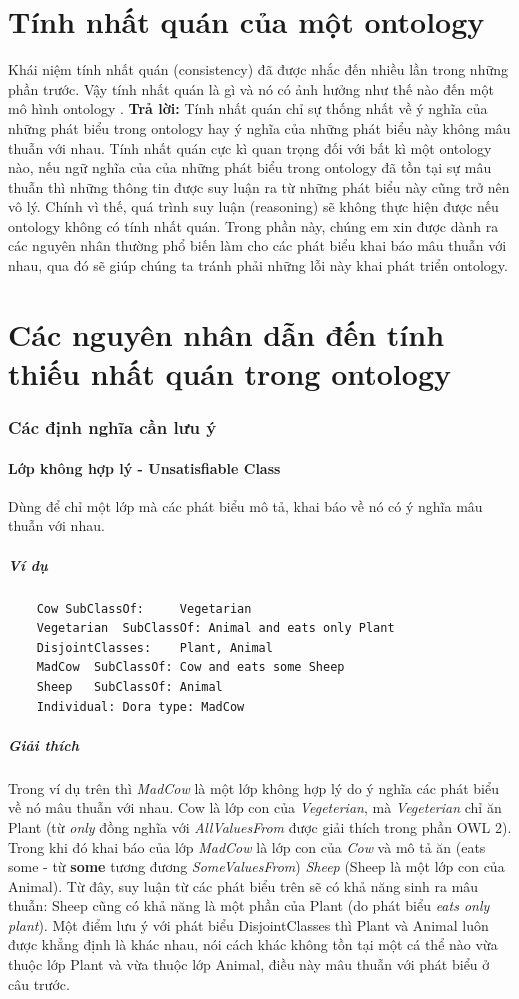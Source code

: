 \section{Tính nhất quán của một ontology}
Khái niệm tính nhất quán (consistency) đã được nhắc đến nhiều lần trong những phần trước. Vậy tính nhất quán là gì và nó có ảnh hưởng như thế nào đến một mô hình ontology . \textbf{Trả lời:} Tính nhất quán chỉ sự thống nhất về ý nghĩa của những phát biểu trong ontology hay ý nghĩa của những phát biểu này không mâu thuẫn với nhau. Tính nhất quán cực kì quan trọng đối với bất kì một ontology nào, nếu ngữ nghĩa của của những phát biểu trong ontology đã tồn tại sự mâu thuẫn thì những thông tin được suy luận ra từ những phát biểu này cũng trở nên vô lý. Chính vì thế, quá trình suy luận (reasoning) sẽ không thực hiện được nếu ontology không có tính nhất quán. Trong phần này, chúng em xin được dành ra các nguyên nhân thường phổ biến làm cho các phát biểu khai báo mâu thuẫn với nhau, qua đó sẽ giúp chúng ta tránh phải những lỗi này khai phát triển ontology.
\section{Các nguyên nhân dẫn đến tính thiếu nhất quán trong ontology}
\subsubsection{Các định nghĩa cần lưu ý \cite{satisfy}}
\paragraph{Lớp không hợp lý - Unsatisfiable Class} Dùng để chỉ một lớp mà các phát biểu mô tả, khai báo về nó có ý nghĩa mâu thuẫn với nhau.
\subparagraph{Ví dụ}
	\begin{verbatim}
	Cow	SubClassOf: 	Vegetarian
	Vegetarian	SubClassOf: Animal and eats only Plant
	DisjointClasses:	Plant, Animal
	MadCow 	SubClassOf: Cow and eats some Sheep
	Sheep 	SubClassOf: Animal
	Individual: Dora type: MadCow
	\end{verbatim}
\subparagraph{Giải thích} Trong ví dụ trên thì \textit{MadCow} là một lớp không hợp lý do ý nghĩa các phát biểu về nó mâu thuẫn với nhau. Cow là lớp con của \textit{Vegeterian}, mà \textit{Vegeterian} chỉ ăn Plant (từ \textit{only} đồng nghĩa với \textit{AllValuesFrom} được giải thích trong phần OWL 2). Trong khi đó khai báo của lớp \textit{MadCow} là lớp con của \textit{Cow} và mô tả ăn (eats some - từ \textbf{some} tương đương \textit{SomeValuesFrom}) \textit{Sheep} (Sheep là một lớp con của Animal). Từ đây, suy luận từ các phát biểu trên sẽ có khả năng sinh ra mâu thuẫn: Sheep cũng có khả năng là một phần của Plant (do phát biểu \textit{eats only plant}). Một điểm lưu ý với phát biểu DisjointClasses thì Plant và Animal luôn được khẳng định là khác nhau, nói cách khác không tồn tại một cá thể nào vừa thuộc lớp Plant và vừa thuộc lớp Animal, điều này mâu thuẫn với phát biểu ở câu trước.  

